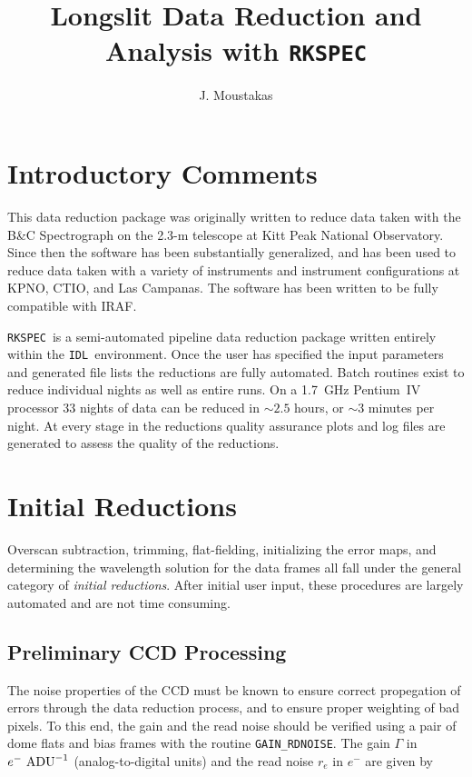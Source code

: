 \documentclass[12pt,preprint]{aastex}
\newcommand{\rk}{{\tt RKSPEC}}
\newcommand{\idl}{{\tt IDL}}
\begin{document}
\pagestyle{plain}

\title{Longslit Data Reduction and Analysis with \rk}
\author{J. Moustakas}

\section{Introductory Comments}\label{sec:intro}

This data reduction package was originally written to reduce data
taken with the B\&C Spectrograph on the 2.3-m telescope at Kitt Peak
National Observatory.  Since then the software has been substantially
generalized, and has been used to reduce data taken with a variety of
instruments and instrument configurations at KPNO, CTIO, and Las
Campanas.  The software has been written to be fully compatible with
IRAF.

\rk\ is a semi-automated pipeline data reduction package written
entirely within the \idl\ environment.  Once the user has specified
the input parameters and generated file lists the reductions are fully
automated.  Batch routines exist to reduce individual nights as well
as entire runs.  On a 1.7~GHz Pentium~IV processor $33$ nights of data
can be reduced in $\sim2.5$ hours, or $\sim3$ minutes per night.  At
every stage in the reductions quality assurance plots and log files
are generated to assess the quality of the reductions.

\section{Initial Reductions}

Overscan subtraction, trimming, flat-fielding, initializing the
error maps, and determining the wavelength solution for the data
frames all fall under the general category of {\em initial
reductions}.  After initial user input, these procedures are largely
automated and are not time consuming.

\subsection{Preliminary CCD Processing}\label{sec:preproc}

The noise properties of the CCD must be known to ensure correct
propegation of errors through the data reduction process, and to
ensure proper weighting of bad pixels.  To this end, the gain and the
read noise should be verified using a pair of dome flats and bias
frames with the routine {\tt GAIN\_RDNOISE}.  The gain $\Gamma$ in
$e^{-}\ {\rm ADU}^{-1}$ (analog-to-digital units) and the read noise
$r_{e}$ in $e^{-}$ are given by
\end{document}
